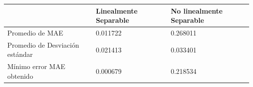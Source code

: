 \begin{tabular}{lll}
\toprule
  & Linealmente Separable & No linealmente Separable \\
\midrule
Promedio de MAE & 0.011722 & 0.268011 \\
Promedio de Desviación estándar & 0.021413 & 0.033401 \\
Mínimo error MAE obtenido & 0.000679 & 0.218534 \\
\bottomrule
\end{tabular}
